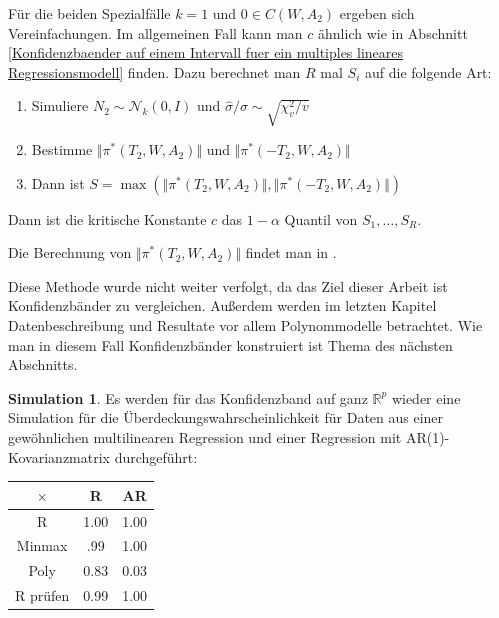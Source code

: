 \documentclass[12pt,a4paper]{article}
\theoremstyle{definition}
\theoremstyle{definition}
\theoremstyle{definition}
\newtheorem{Simulation}[Definition]{Simulation}
\theoremstyle{definition}
\newcommand{\UeberRR}{1.00}
\newcommand{\UeberRMinmax}{.99}
\newcommand{\UeberRMinmaxPoly}{0.83}
\newcommand{\UeberARR}{1.00}
\newcommand{\UeberARMinmax}{1.00}
\newcommand{\UeberARMinmaxPoly}{0.03}
\newcommand{\UeberRRpruefen}{0.99}
\newcommand{\UeberARRpruefen}{1.00}
\begin{document}
Für die beiden Spezialfälle $k=1$ und $0 \in C(W,A_2)$ ergeben sich Vereinfachungen. Im allgemeinen Fall kann man $c$ ähnlich wie in Abschnitt \ref{Konfidenzbaender auf einem Intervall fuer ein multiples lineares Regressionsmodell} finden. Dazu berechnet man $R$ mal $S_i$ auf die folgende Art:

\begin{enumerate}
\item Simuliere $N_2 \sim \mathscr{N}_{k}(0,I)$ und $\hat{\sigma}/\sigma \sim \sqrt{\chi^2_v/v}$
\item Bestimme $\Vert \pi^{*}(T_2,W,A_2) \Vert$ und $\Vert \pi^{*}(-T_2,W,A_2) \Vert$
\item Dann ist $S= \max(\Vert \pi^{*}(T_2,W,A_2) \Vert, \Vert \pi^{*}(-T_2,W,A_2) \Vert )$
\end{enumerate}

Dann ist die kritische Konstante $c$ das $1-\alpha$ Quantil von $S_1, \ldots, S_R$.

Die Berechnung von $\Vert \pi^{*}(T_2,W,A_2) \Vert$ findet man in \cite[Appendix B]{Liu64}.

Diese Methode wurde nicht weiter verfolgt, da das Ziel dieser Arbeit ist Konfidenzbänder zu vergleichen. Außerdem werden im letzten Kapitel Datenbeschreibung und Resultate vor allem Polynommodelle betrachtet. Wie man in diesem Fall Konfidenzbänder konstruiert ist Thema des nächsten Abschnitts.

\begin{Simulation}
Es werden für das Konfidenzband auf ganz $\mathbb{R}^{p}$ wieder eine Simulation für die Überdeckungswahrscheinlichkeit für Daten aus einer gewöhnlichen multilinearen Regression und einer Regression mit AR(1)-Kovarianzmatrix durchgeführt:

\begin{center}
\begin{tabular}{|c|c|c|}
\hline 
$\times$ & R & AR \\ 
\hline 
R		& \UeberRR			& \UeberARR \\ 
\hline 
Minmax	& \UeberRMinmax	 	& \UeberARMinmax \\ 
\hline 
Poly 	& \UeberRMinmaxPoly & \UeberARMinmaxPoly \\ 
\hline 
R prüfen	& \UeberRRpruefen & \UeberARRpruefen \\ 
\hline 
\end{tabular} 
\end{center}

\end{Simulation}
\end{document}
